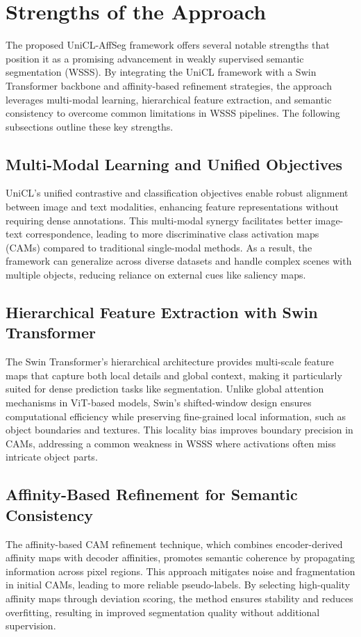 \section{Strengths of the Approach}
\label{sec:strengths_of_approach}

The proposed UniCL-AffSeg framework offers several notable strengths that position it as a promising advancement in weakly supervised semantic segmentation (WSSS). By integrating the UniCL framework with a Swin Transformer backbone and affinity-based refinement strategies, the approach leverages multi-modal learning, hierarchical feature extraction, and semantic consistency to overcome common limitations in WSSS pipelines. The following subsections outline these key strengths.

\subsection{Multi-Modal Learning and Unified Objectives}
UniCL's unified contrastive and classification objectives enable robust alignment between image and text modalities, enhancing feature representations without requiring dense annotations. This multi-modal synergy facilitates better image-text correspondence, leading to more discriminative class activation maps (CAMs) compared to traditional single-modal methods. As a result, the framework can generalize across diverse datasets and handle complex scenes with multiple objects, reducing reliance on external cues like saliency maps.

\subsection{Hierarchical Feature Extraction with Swin Transformer}
The Swin Transformer's hierarchical architecture provides multi-scale feature maps that capture both local details and global context, making it particularly suited for dense prediction tasks like segmentation. Unlike global attention mechanisms in ViT-based models, Swin's shifted-window design ensures computational efficiency while preserving fine-grained local information, such as object boundaries and textures. This locality bias improves boundary precision in CAMs, addressing a common weakness in WSSS where activations often miss intricate object parts.

\subsection{Affinity-Based Refinement for Semantic Consistency}
The affinity-based CAM refinement technique, which combines encoder-derived affinity maps with decoder affinities, promotes semantic coherence by propagating information across pixel regions. This approach mitigates noise and fragmentation in initial CAMs, leading to more reliable pseudo-labels. By selecting high-quality affinity maps through deviation scoring, the method ensures stability and reduces overfitting, resulting in improved segmentation quality without additional supervision.

